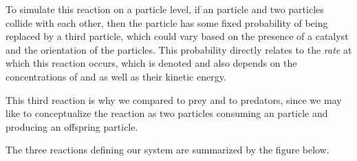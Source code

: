 To simulate this reaction on a particle level, if an  particle and two  particles collide with each other, then the  particle has some fixed probability of being replaced by a third  particle, which could vary based on the presence of a catalyst and the orientation of the particles. This probability directly relates to the \textit{rate} at which this reaction occurs, which is denoted  and also depends on the concentrations of  and  as well as their kinetic energy.

This third reaction is why we compared  to prey and  to predators, since we may like to conceptualize the reaction as two  particles consuming an  particle and producing an offspring  particle.

The three reactions defining our system are summarized by the figure below.

